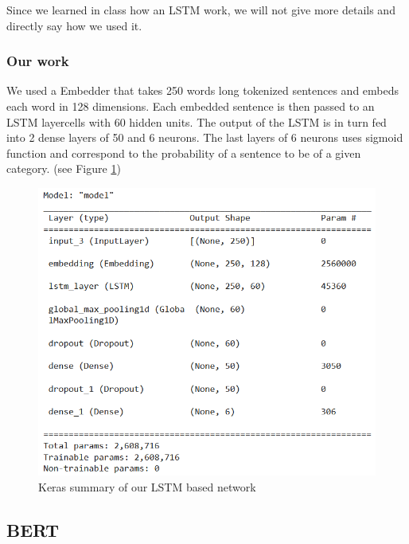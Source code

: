 \documentclass[11pt]{scrartcl}
\begin{document}
Since we learned in class how an LSTM work, we will not give more details and directly say how we used it.

\subsubsection{Our work}

We used a Embedder that takes 250 words long tokenized sentences and embeds each word in 128 dimensions. Each embedded sentence is then passed to an LSTM layercells with 60 hidden units. The output of the LSTM is in turn fed into 2 dense layers of 50 and 6 neurons. The last layers of 6 neurons uses sigmoid function and correspond to the probability of a sentence to be of a given category. (see Figure \ref{fig:sumlstm})

\begin{figure}[H]
    \centering
    \includegraphics[width=12cm]{img/summary LSTM.PNG}
    \caption{Keras summary of our LSTM based network}
    \label{fig:sumlstm}
\end{figure}


\subsection{BERT}
\end{document}
